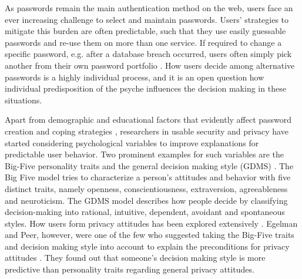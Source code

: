 
As passwords remain the main authentication method on the web, users face an ever increasing challenge to select and maintain passwords. Users' strategies to mitigate this burden are often predictable, such that they use easily guessable passwords and re-use them on more than one service. If required to change a specific password, e.g. after a database breach occurred, users often simply pick another from their own password portfolio \cite{Bonneau2015ImperfectAuthentication, Florencio2014PasswordPortfoliosFiniteUser, Stobert2014PasswordLifeCycle}. How users decide among alternative passwords is a highly individual process, and it is an open question how individual predisposition of the psyche influences the decision making in these situations.


Apart from demographic and educational factors that evidently affect password creation and coping strategies \cite{Mazurek2013Measuring}, researchers in usable security and privacy have started considering psychological variables to improve explanations for predictable user behavior. Two prominent examples for such variables are the Big-Five personality traits \cite{Goldberg1990BigFive} and the general decision making style (GDMS) \cite{Scott1995GDMS}. The Big Five model tries to characterize a person's attitudes and behavior with five distinct traits, namely openness, conscientiousness, extraversion, agreeableness and neuroticism. The GDMS model describes how people decide by classifying decision-making into rational, intuitive, dependent, avoidant and spontaneous styles. How users form privacy attitudes has been explored extensively \cite{Acquisti2005PrivacyRationality,Korff2014TooMuchChoice,Spiekermann2001EPrivacyPreferences,Woodruff2014PrivacyFundamentalist}. Egelman and Peer, however, were one of the few who suggested taking the Big-Five traits and decision making style into account to explain the preconditions for privacy attitudes \cite{Egelman2015AverageUser}. They found out that someone's decision making style is more predictive than personality traits regarding general privacy attitudes. %

